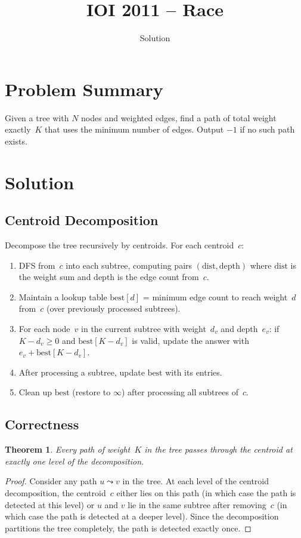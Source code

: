 \documentclass[11pt,a4paper]{article}
\title{IOI 2011 -- Race}
\author{Solution}
\date{}
\newtheorem{theorem}{Theorem}
\begin{document}
\maketitle

\section{Problem Summary}
Given a tree with $N$ nodes and weighted edges, find a path of total weight exactly~$K$ that uses the minimum number of edges. Output $-1$ if no such path exists.

\section{Solution}

\subsection{Centroid Decomposition}
Decompose the tree recursively by centroids. For each centroid~$c$:

\begin{enumerate}
    \item DFS from~$c$ into each subtree, computing pairs $(\text{dist}, \text{depth})$ where $\text{dist}$ is the weight sum and $\text{depth}$ is the edge count from~$c$.
    \item Maintain a lookup table $\text{best}[d]$ = minimum edge count to reach weight~$d$ from~$c$ (over previously processed subtrees).
    \item For each node~$v$ in the current subtree with weight~$d_v$ and depth~$e_v$: if $K - d_v \ge 0$ and $\text{best}[K - d_v]$ is valid, update the answer with $e_v + \text{best}[K - d_v]$.
    \item After processing a subtree, update $\text{best}$ with its entries.
    \item Clean up $\text{best}$ (restore to $\infty$) after processing all subtrees of~$c$.
\end{enumerate}

\subsection{Correctness}

\begin{theorem}
Every path of weight~$K$ in the tree passes through the centroid at exactly one level of the decomposition.
\end{theorem}
\begin{proof}
Consider any path $u \leadsto v$ in the tree. At each level of the centroid decomposition, the centroid~$c$ either lies on this path (in which case the path is detected at this level) or $u$ and $v$ lie in the same subtree after removing~$c$ (in which case the path is detected at a deeper level). Since the decomposition partitions the tree completely, the path is detected exactly once.
\end{proof}
\end{document}
